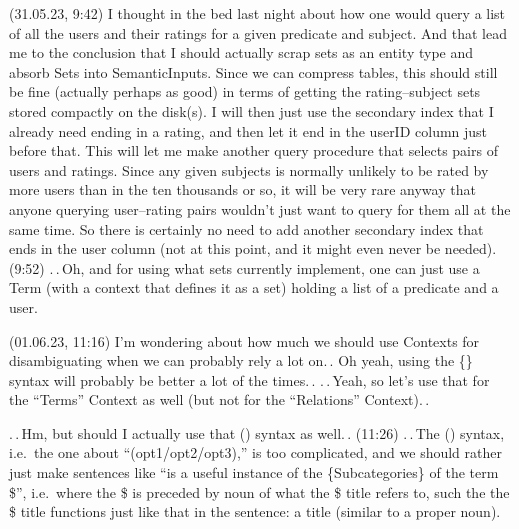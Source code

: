 \documentclass{report}
\begin{document}
(31.05.23, 9:42) I thought in the bed last night about how one would query a list of all the users and their ratings for a given predicate and subject. And that lead me to the conclusion that I should actually scrap sets as an entity type and absorb Sets into SemanticInputs. Since we can compress tables, this should still be fine (actually perhaps as good) in terms of getting the rating--subject sets stored compactly on the disk(s). I will then just use the secondary index that I already need ending in a rating, and then let it end in the userID column just before that. This will let me make another query procedure that selects pairs of users and ratings. Since any given subjects is normally unlikely to be rated by more users than in the ten thousands or so, it will be very rare anyway that anyone querying user--rating pairs wouldn't just want to query for them all at the same time. So there is certainly no need to add another secondary index that ends in the user column (not at this point, and it might even never be needed). (9:52) .\,.\,Oh, and for using what sets currently implement, one can just use a Term (with a context that defines it as a set) holding a list of a predicate and a user.

(01.06.23, 11:16) I'm wondering about how much we should use Contexts for disambiguating when we can probably rely a lot on.\,. Oh yeah, using the \{\} syntax will probably be better a lot of the times.\,. .\,.\,Yeah, so let's use that for the ``Terms'' Context as well (but not for the ``Relations'' Context).\,.

.\,.\,Hm, but should I actually use that () syntax as well.\,. (11:26) .\,.\,The () syntax, i.e.\ the one about ``(opt1/opt2/opt3),'' is too complicated, and we should rather just make sentences like ``is a useful instance of the \{Subcategories\} of the term \$'', i.e.\ where the \$ is preceded by noun of what the \$ title refers to, such the the \$ title functions just like that in the sentence: a title (similar to a proper noun). 
\end{document}
